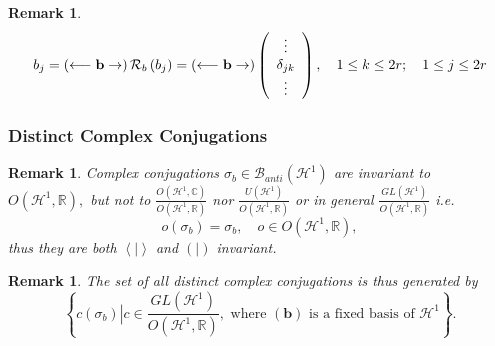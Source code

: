 \documentclass[aps,preprint]{revtex4}%
\newtheorem{remark}[theorem]{Remark}
\begin{document}
\begin{remark}%
\begin{equation}
b_{j}=\left(  \longleftarrow\mathbf{b\rightarrow}\right)  \mathcal{R}%
_{b}\left(  b_{j}\right)  =\left(  \longleftarrow\mathbf{b\rightarrow}\right)
\left(
\begin{array}
[c]{c}%
\vdots\\
\delta_{jk}\\
\vdots
\end{array}
\right)  ,\quad1\leq k\leq2r;\quad1\leq j\leq2r
\end{equation}

\end{remark}

\subsubsection{Distinct Complex Conjugations
\label{Distinct Complex Conjugations}}

\begin{remark}
Complex conjugations $\sigma_{b}\in\mathcal{B}_{anti}\left(  \mathcal{H}%
^{1}\right)  $ \emph{are} invariant to $O\left(  \mathcal{H}^{1}%
,\mathbb{R}\right)  ,$ \emph{but not} to $\frac{O\left(  \mathcal{H}%
^{1},\mathbb{C}\right)  }{O\left(  \mathcal{H}^{1},\mathbb{R}\right)  }$ nor
$\frac{U\left(  \mathcal{H}^{1}\right)  }{O\left(  \mathcal{H}^{1}%
,\mathbb{R}\right)  }$ or in general $\frac{GL\left(  \mathcal{H}^{1}\right)
}{O\left(  \mathcal{H}^{1},\mathbb{R}\right)  }$ i.e.
\begin{equation}
o\left(  \sigma_{b}\right)  =\sigma_{b},\quad o\in O\left(  \mathcal{H}%
^{1},\mathbb{R}\right)  ,
\end{equation}
thus they are both $\left\langle \left.  {}\right\vert \right\rangle $ and
$\left(  \left.  {}\right\vert \right)  $ invariant.
\end{remark}

\begin{remark}
The set of all distinct complex conjugations is thus generated by
\begin{equation}
\left\{  \left.  \overset{}{c\left(  \sigma_{b}\right)  }\right\vert c\in
\frac{GL\left(  \mathcal{H}^{1}\right)  }{O\left(  \mathcal{H}^{1}%
,\mathbb{R}\right)  },\text{ where }\left(  \mathbf{b}\right)  \text{ is a
fixed basis of }\mathcal{H}^{1}\right\}  .
\end{equation}

\end{remark}
\end{document}
